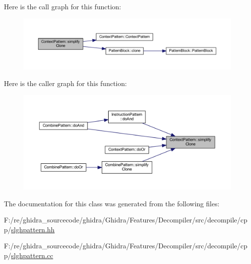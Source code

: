 Here is the call graph for this function\+:
\nopagebreak
\begin{figure}[H]
\begin{center}
\leavevmode
\includegraphics[width=350pt]{class_context_pattern_a42838644f963d9b251c0d221c20c8116_cgraph}
\end{center}
\end{figure}
Here is the caller graph for this function\+:
\nopagebreak
\begin{figure}[H]
\begin{center}
\leavevmode
\includegraphics[width=350pt]{class_context_pattern_a42838644f963d9b251c0d221c20c8116_icgraph}
\end{center}
\end{figure}


The documentation for this class was generated from the following files\+:\begin{DoxyCompactItemize}
\item 
F\+:/re/ghidra\+\_\+sourcecode/ghidra/\+Ghidra/\+Features/\+Decompiler/src/decompile/cpp/\mbox{\hyperlink{slghpattern_8hh}{slghpattern.\+hh}}\item 
F\+:/re/ghidra\+\_\+sourcecode/ghidra/\+Ghidra/\+Features/\+Decompiler/src/decompile/cpp/\mbox{\hyperlink{slghpattern_8cc}{slghpattern.\+cc}}\end{DoxyCompactItemize}
